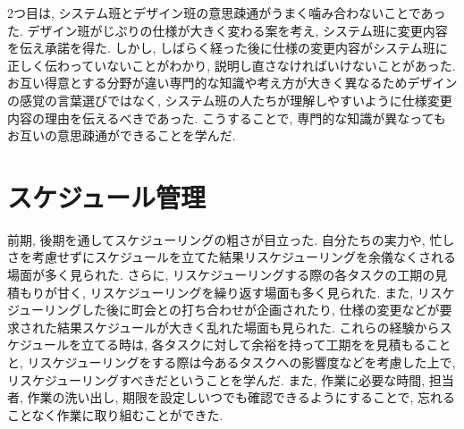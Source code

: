 2つ目は, システム班とデザイン班の意思疎通がうまく噛み合わないことであった.
デザイン班がじぷりの仕様が大きく変わる案を考え, システム班に変更内容を伝え承諾を得た. しかし, しばらく経った後に仕様の変更内容がシステム班に正しく伝わっていないことがわかり,
説明し直さなければいけないことがあった. お互い得意とする分野が違い専門的な知識や考え方が大きく異なるためデザインの感覚の言葉選びではなく,
システム班の人たちが理解しやすいように仕様変更内容の理由を伝えるべきであった. こうすることで, 専門的な知識が異なってもお互いの意思疎通ができることを学んだ.

\section{スケジュール管理}
前期, 後期を通してスケジューリングの粗さが目立った. 自分たちの実力や, 忙しさを考慮せずにスケジュールを立てた結果リスケジューリングを余儀なくされる場面が多く見られた. さらに, リスケジューリングする際の各タスクの工期の見積もりが甘く, リスケジューリングを繰り返す場面も多く見られた. また, リスケジューリングした後に町会との打ち合わせが企画されたり, 仕様の変更などが要求された結果スケジュールが大きく乱れた場面も見られた.
これらの経験からスケジュールを立てる時は, 各タスクに対して余裕を持って工期をを見積もることと, リスケジューリングをする際は今あるタスクへの影響度などを考慮した上で, リスケジューリングすべきだということを学んだ. また, 作業に必要な時間, 担当者, 作業の洗い出し, 期限を設定しいつでも確認できるようにすることで, 忘れることなく作業に取り組むことができた.
